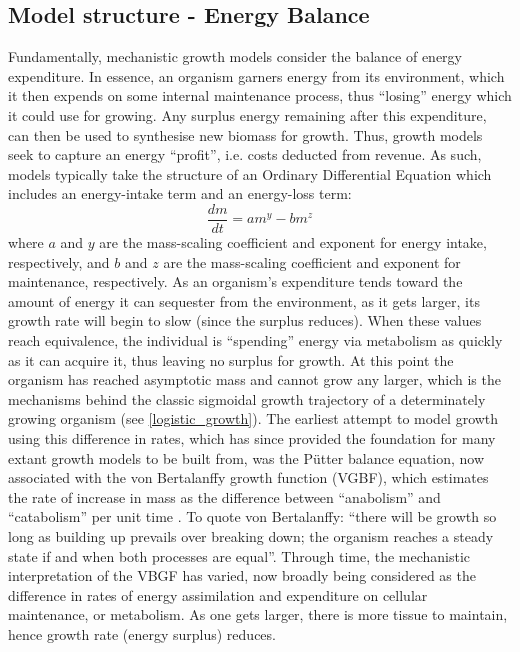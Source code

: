 \documentclass[a4paper]{article} %
\begin{document}
        \subsection{Model structure - Energy Balance}
        Fundamentally, mechanistic growth models consider the balance of energy expenditure. In essence, an organism garners energy from its environment, which it then expends on some internal maintenance process, thus ``losing'' energy which it could use for growing. Any surplus energy remaining after this expenditure, can then be used to synthesise new biomass for growth.  Thus, growth models seek to capture an energy ``profit'', i.e. costs deducted from revenue. As such, models typically take the structure of an Ordinary Differential Equation which includes an energy-intake term and an energy-loss term:
        \begin{equation}
            \frac{dm}{dt} = am^y - bm^z \label{difference_equation}
        \end{equation}        
        where $a$ and $y$ are the mass-scaling coefficient and exponent for energy intake, respectively, and $b$ and $z$ are the mass-scaling coefficient and exponent for maintenance, respectively. As an organism's expenditure tends toward the amount of energy it can sequester from the environment, as it gets larger, its growth rate will begin to slow (since the surplus reduces). When these values reach equivalence, the individual is ``spending'' energy via metabolism as quickly as it can acquire it, thus leaving no surplus for growth. At this point the organism has reached asymptotic mass and cannot grow any larger, which is the mechanisms behind the classic sigmoidal growth trajectory of a determinately growing organism (see \ref{logistic_growth}).  The earliest attempt to model growth using this difference in rates, which has since provided the foundation for many extant growth models to be built from, was the P\"{u}tter balance equation, now associated with the von Bertalanffy growth function (VGBF), which estimates the rate of increase in mass as the difference between ``anabolism'' and ``catabolism'' per unit time \autocite{Putter1920, vonBert1938, VonBertalanffy1957}. To quote von Bertalanffy: ``there will be growth so long as building up prevails over breaking down; the organism reaches a steady state if and when both processes are equal''. Through time, the mechanistic interpretation of the VBGF has varied, now broadly being considered as the difference in rates of energy assimilation and expenditure on cellular maintenance, or metabolism. As one gets larger, there is more tissue to maintain, hence growth rate (energy surplus) reduces.
        
\end{document}
